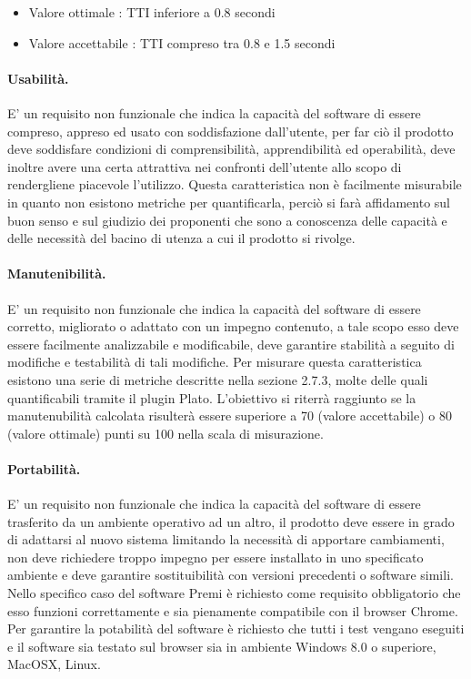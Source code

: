 \begin{itemize}
	\item Valore ottimale :  TTI inferiore a 0.8 secondi
	\item Valore accettabile :  TTI compreso tra 0.8 e 1.5 secondi
\end{itemize}

\paragraph{Usabilità.}
E' un requisito non funzionale che indica la capacità del software di essere compreso, appreso ed usato con soddisfazione dall'utente, per far ciò il prodotto deve soddisfare condizioni di comprensibilità, apprendibilità ed operabilità, deve inoltre avere una certa attrattiva nei confronti dell'utente allo scopo di rendergliene piacevole l'utilizzo. Questa caratteristica non è facilmente misurabile in quanto non esistono metriche per quantificarla, perciò si farà affidamento sul buon senso e sul giudizio dei proponenti che sono a conoscenza delle capacità e delle necessità del bacino di utenza a cui il prodotto si rivolge.

\paragraph{Manutenibilità.}
E' un requisito non funzionale che indica la capacità del software di essere corretto, migliorato o adattato con un impegno contenuto, a tale scopo esso deve essere facilmente analizzabile e modificabile, deve garantire stabilità a seguito di modifiche e testabilità di tali modifiche. Per misurare questa caratteristica esistono una serie di metriche descritte nella sezione 2.7.3, molte delle quali quantificabili tramite il plugin Plato. L'obiettivo si riterrà raggiunto se la manutenubilità calcolata risulterà essere superiore a 70 (valore accettabile) o 80 (valore ottimale) punti su 100 nella scala di misurazione.

\paragraph{Portabilità.}
E' un requisito non funzionale che indica la capacità del software di essere trasferito da un ambiente operativo ad un altro, il prodotto deve essere in grado di adattarsi al nuovo sistema limitando la necessità di apportare cambiamenti, non deve richiedere troppo impegno per essere installato in uno specificato ambiente e deve garantire sostituibilità con versioni precedenti o software simili. Nello specifico caso del software Premi è richiesto come requisito obbligatorio che esso funzioni correttamente e sia pienamente compatibile con il browser Chrome. Per garantire la potabilità del software è richiesto che tutti i test vengano eseguiti e il software sia testato sul browser sia in ambiente Windows 8.0 o superiore, MacOSX,  Linux.

